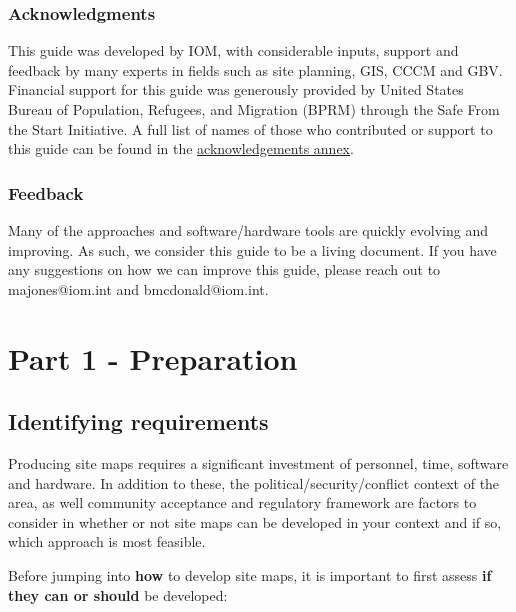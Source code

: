 \documentclass[
  a4paper,
  onecolumn,
  oneside]{book}
\begin{document}
\hypertarget{acknowledgments}{%
\section*{Acknowledgments}\label{acknowledgments}}


This guide was developed by IOM, with considerable inputs, support and
feedback by many experts in fields such as site planning, GIS, CCCM and
GBV. Financial support for this guide was generously provided by United
States Bureau of Population, Refugees, and Migration (BPRM) through the
Safe From the Start Initiative. A full list of names of those who
contributed or support to this guide can be found in the
\href{/annexes/acknowledgements.html}{acknowledgements annex}.

\hypertarget{feedback}{%
\section*{Feedback}\label{feedback}}


Many of the approaches and software/hardware tools are quickly evolving
and improving. As such, we consider this guide to be a living document.
If you have any suggestions on how we can improve this guide, please
reach out to majones@iom.int and bmcdonald@iom.int.

\part{Part 1 - Preparation}

\hypertarget{identifying-requirements}{%
\chapter{Identifying requirements}\label{identifying-requirements}}

Producing site maps requires a significant investment of personnel,
time, software and hardware. In addition to these, the
political/security/conflict context of the area, as well community
acceptance and regulatory framework are factors to consider in whether
or not site maps can be developed in your context and if so, which
approach is most feasible.

Before jumping into \textbf{how} to develop site maps, it is important
to first assess \textbf{if they can or should} be developed:
\end{document}
